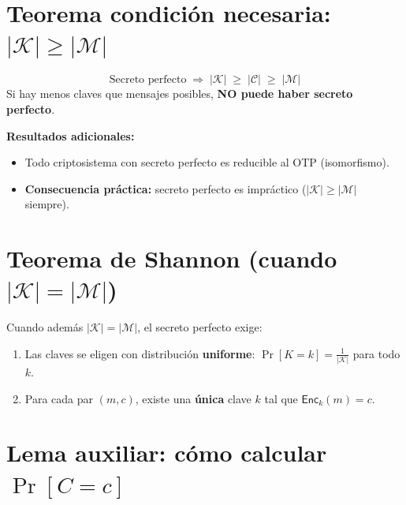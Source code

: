 \documentclass[11pt,a4paper]{article}
\begin{document}
\section{Teorema condición necesaria: $|\mathcal{K}| \geq |\mathcal{M}|$}

\begin{tcolorbox}[defstyle, title={Teorema (condición necesaria)}]
\[
  \text{Secreto perfecto} \;\Longrightarrow\; |\mathcal{K}| \;\geq\; |\mathcal{C}| \;\geq\; |\mathcal{M}|
\]
Si hay menos claves que mensajes posibles, \textbf{NO puede haber secreto perfecto}.
\end{tcolorbox}

\medskip
\noindent\textbf{Resultados adicionales:}
\begin{itemize}[leftmargin=1.8em]
  \item Todo criptosistema con secreto perfecto es reducible al OTP (isomorfismo).
  \item \textbf{Consecuencia práctica:} secreto perfecto es impráctico ($|\mathcal{K}| \geq |\mathcal{M}|$ siempre).
\end{itemize}

\section{Teorema de Shannon (cuando $|\mathcal{K}| = |\mathcal{M}|$)}

\begin{tcolorbox}[defstyle, title={Teorema de Shannon}]
Cuando además $|\mathcal{K}| = |\mathcal{M}|$, el secreto perfecto exige:
\begin{enumerate}[label=\textbf{\arabic*.}, leftmargin=2em]
  \item Las claves se eligen con distribución \textbf{uniforme}:
    $\Pr[K{=}k] = \tfrac{1}{|\mathcal{K}|}$ para todo $k$.
  \item Para cada par $(m, c)$, existe una \textbf{única} clave $k$ tal que $\mathsf{Enc}_k(m) = c$.
\end{enumerate}
\end{tcolorbox}

\section{Lema auxiliar: cómo calcular $\Pr[C{=}c]$}
\end{document}
